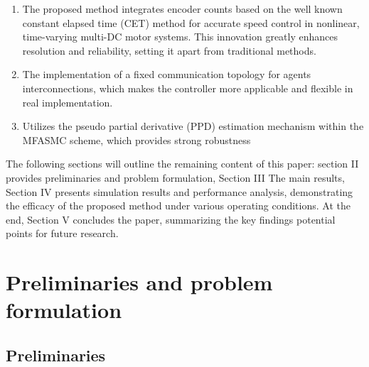 \documentclass[journal,onecolumn]{IEEEtran}
\begin{document}
\begin{enumerate}

    \item The proposed method integrates encoder counts based on the well known constant elapsed time (CET) method\cite{31} for accurate speed control in nonlinear, time-varying multi-DC motor systems. This innovation greatly enhances resolution and reliability, setting it apart from traditional methods.
    
    \item The implementation of a fixed communication topology for agents interconnections, which makes the controller more applicable and flexible in real implementation.
    
    \item Utilizes the pseudo partial derivative (PPD) estimation mechanism within the MFASMC scheme, which provides strong robustness

\end{enumerate}



    The following sections will outline the remaining content of this paper:
    section II provides preliminaries and problem formulation, Section III The main results, Section IV presents simulation results and performance analysis, demonstrating the efficacy of the proposed method under various operating conditions.
    At the end, Section V concludes the paper, summarizing the key findings potential points for future research.


\section{Preliminaries and problem formulation}\label{section:2}
\subsection{Preliminaries}
\end{document}
